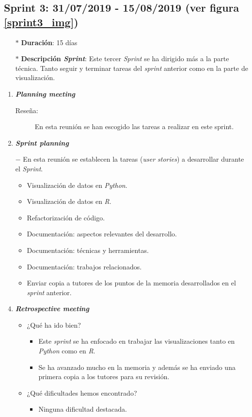 \subsection{Sprint 3: 31/07/2019 - 15/08/2019 (ver figura \ref{sprint3_img})}\label{sprint3}
\begin{itemize}
	\item[$\ast$] \textbf{Duración}:  15 días
	\item[$\ast$] \textbf{Descripción \textit{Sprint}}: Este tercer \textit{Sprint} se ha dirigido más a la parte técnica. Tanto seguir y terminar tareas del \textit{sprint }anterior como en la parte de visualización.
\end{itemize}
\begin{enumerate}
	\item \textbf{\textit{Planning meeting}}
	\begin{description}
		\item[Reseña:] En esta reunión se han escogido las tareas a realizar en este sprint.
	\end{description}
	\item \textbf{\textit{Sprint planning}}
		\item[$-$] En esta reunión se establecen la tareas (\textit{user stories}) a desarrollar durante el \textit{Sprint}. 
	\begin{itemize}
		\item Visualización de datos en \textit{Python}.
		\item Visualización de datos en \textit{R}.
		\item Refactorización de código.
		\item Documentación: aspectos relevantes del desarrollo.
		\item Documentación: técnicas y herramientas.
		\item Documentación: trabajos relacionados.
		\item Enviar copia a tutores de los puntos de la memoria desarrollados en el \textit{sprint} anterior.
	\end{itemize}
	\item \textbf{\textit{Retrospective meeting}}
	\begin{itemize}
		\item ¿Qué ha ido bien?
		\begin{itemize}
			\item Este \textit{sprint} se ha enfocado en trabajar las visualizaciones tanto en \textit{Python} como en \textit{R}. 
			\item Se ha avanzado mucho en la memoria y además se ha enviado una primera copia a los tutores para su revisión.
		\end{itemize}
		\item ¿Qué dificultades hemos encontrado?
		\begin{itemize}
			\item Ninguna dificultad destacada. 
		\end{itemize}
	\end{itemize}	
\end{enumerate}

